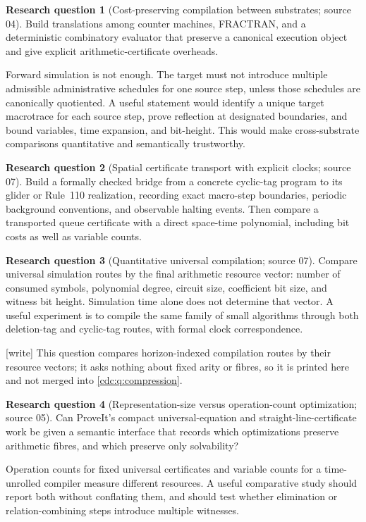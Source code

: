 \documentclass[11pt,a4paper]{article}
\theoremstyle{definition}
\newtheorem{question}[question]{Research question}
\theoremstyle{remark}
\newcommand{\wtag}{\textup{[write]}}%
\begin{document}
\begin{question}[Cost-preserving compilation between substrates; source 04]
Build translations among counter machines, FRACTRAN, and a deterministic combinatory evaluator that preserve a canonical execution object and give explicit arithmetic-certificate overheads.
\end{question}
Forward simulation is not enough. The target must not introduce multiple admissible administrative schedules for one source step, unless those schedules are canonically quotiented. A useful statement would identify a unique target macrotrace for each source step, prove reflection at designated boundaries, and bound variables, time expansion, and bit-height. This would make cross-substrate comparisons quantitative and semantically trustworthy.

\begin{question}[Spatial certificate transport with explicit clocks; source 07]
Build a formally checked bridge from a concrete cyclic-tag program to its glider or Rule~110 realization, recording exact macro-step boundaries, periodic background conventions, and observable halting events. Then compare a transported queue certificate with a direct space-time polynomial, including bit costs as well as variable counts.
\end{question}

\begin{question}[Quantitative universal compilation; source 07]
Compare universal simulation routes by the final arithmetic resource vector: number of consumed symbols, polynomial degree, circuit size, coefficient bit size, and witness bit height. Simulation time alone does not determine that vector. A useful experiment is to compile the same family of small algorithms through both deletion-tag and cyclic-tag routes, with formal clock correspondence.
\end{question}

\wtag{} This question compares horizon-indexed compilation routes by
their resource vectors; it asks nothing about fixed arity or fibres, so it
is printed here and not merged into \cref{cdc:q:compression}.

\begin{question}[Representation-size versus operation-count optimization; source 05]
Can ProveIt's compact universal-equation and straight-line-certificate work be given a semantic interface that records which optimizations preserve arithmetic fibres, and which preserve only solvability?
\end{question}
Operation counts for fixed universal certificates and variable counts for a time-unrolled compiler measure different resources. A useful comparative study should report both without conflating them, and should test whether elimination or relation-combining steps introduce multiple witnesses.
\end{document}

